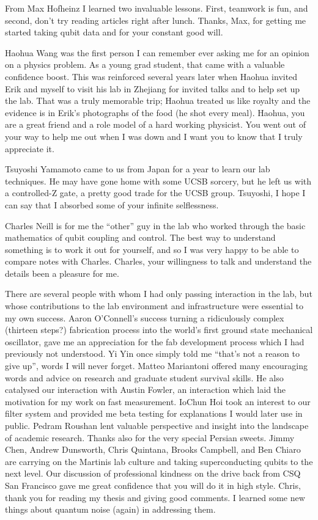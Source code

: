 \begin{acknowledgements}
From Max Hofheinz I learned two invaluable lessons.
First, teamwork is fun, and second, don't try reading articles right after lunch.
Thanks, Max, for getting me started taking qubit data and for your constant good will.

Haohua Wang was the first person I can remember ever asking me for an opinion on a physics problem.
As a young grad student, that came with a valuable confidence boost.
This was reinforced several years later when Haohua invited Erik and myself to visit his lab in Zhejiang for invited talks and to help set up the lab.
That was a truly memorable trip; Haohua treated us like royalty and the evidence is in Erik's photographs of the food (he shot every meal).
Haohua, you are a great friend and a role model of a hard working physicist.
You went out of your way to help me out when I was down and I want you to know that I truly appreciate it.

Tsuyoshi Yamamoto came to us from Japan for a year to learn our lab techniques.
He may have gone home with some UCSB sorcery, but he left us with a controlled-Z gate, a pretty good trade for the UCSB group.
Tsuyoshi, I hope I can say that I absorbed some of your infinite selflessness.

Charles Neill is for me the ``other'' guy in the lab who worked through the basic mathematics of qubit coupling and control.
The best way to understand something is to work it out for yourself, and so I was very happy to be able to compare notes with Charles.
Charles, your willingness to talk and understand the details been a pleasure for me.

There are several people with whom I had only passing interaction in the lab, but whose contributions to the lab environment and infrastructure were essential to my own success.
Aaron O'Connell's success turning a ridiculously complex (thirteen steps?) fabrication process into the world's first ground state mechanical oscillator, gave me an appreciation for the fab development process which I had previously not understood.
Yi Yin once simply told me ``that's not a reason to give up'', words I will never forget.
Matteo Mariantoni offered many encouraging words and advice on research and graduate student survival skills.
He also catalysed our interaction with Austin Fowler, an interaction which laid the motivation for my work on fast measurement.
IoChun Hoi took an interest to our filter system and provided me beta testing for explanations I would later use in public.
Pedram Roushan lent valuable perspective and insight into the landscape of academic research.
Thanks also for the very special Persian sweets.
Jimmy Chen, Andrew Dunsworth, Chris Quintana, Brooks Campbell, and Ben Chiaro are carrying on the Martinis lab culture and taking superconducting qubits to the next level.
Our discussion of professional kindness on the drive back from CSQ San Francisco gave me great confidence that you will do it in high style.
Chris, thank you for reading my thesis and giving good comments.
I learned some new things about quantum noise (again) in addressing them.


\end{acknowledgements}
